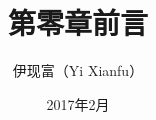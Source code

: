 



\title[前言]{第零章\quad 前言}
\author[Yixf]{伊现富（Yi Xianfu）}
\date{2017年2月}

% 



\begin{frame}
\end{frame}




